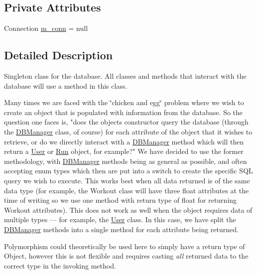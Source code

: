 \subsection*{Private Attributes}
\begin{DoxyCompactItemize}
\item 
Connection \mbox{\hyperlink{classcom_1_1activitytracker_1_1_d_b_manager_a064088d13ac09eb147fdc19268771521}{m\+\_\+conn}} = null
\end{DoxyCompactItemize}


\subsection{Detailed Description}
Singleton class for the database. All classes and methods that interact with the database will use a method in this class.

Many times we are faced with the \char`\"{}chicken and egg\char`\"{} problem where we wish to create an object that is populated with information from the database. So the question one faces is, "does the object\textquotesingle{}s constructor query the database (through the \mbox{\hyperlink{classcom_1_1activitytracker_1_1_d_b_manager}{D\+B\+Manager}} class, of course) for each attribute of the object that it wishes to retrieve, or do we directly interact with a \mbox{\hyperlink{classcom_1_1activitytracker_1_1_d_b_manager}{D\+B\+Manager}} method which will then return a \mbox{\hyperlink{classcom_1_1activitytracker_1_1_user}{User}} or \mbox{\hyperlink{classcom_1_1activitytracker_1_1_run}{Run}} object, for example?" We have decided to use the former methodology, with \mbox{\hyperlink{classcom_1_1activitytracker_1_1_d_b_manager}{D\+B\+Manager}} methods being as general as possible, and often accepting enum types which then are put into a switch to create the specific S\+QL query we wish to execute. This works best when all data returned is of the same data type (for example, the Workout class will have three float attributes at the time of writing so we use one method with return type of float for returning Workout attributes). This does not work as well when the object requires data of multiple types --- for example, the \mbox{\hyperlink{classcom_1_1activitytracker_1_1_user}{User}} class. In this case, we have split the \mbox{\hyperlink{classcom_1_1activitytracker_1_1_d_b_manager}{D\+B\+Manager}} methods into a single method for each attribute being returned.

Polymorphism could theoretically be used here to simply have a return type of Object, however this is not flexible and requires casting {\itshape all} returned data to the correct type in the invoking method. 

